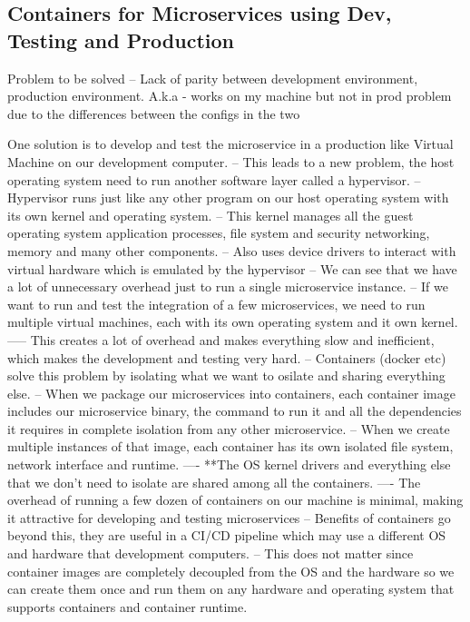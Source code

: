 \documentclass[a4paper, 11pt]{book}
\begin{document}
{    \subsection{Containers for Microservices using Dev, Testing and Production}
    Problem to be solved -- Lack of parity between development environment, production environment.
    A.k.a - works on my machine but not in prod problem due to the differences between the configs in the two

    One solution is to develop and test the microservice in a production like Virtual Machine on our development computer.
    -- This leads to a new problem, the host operating system need to run another software layer called a hypervisor.
    -- Hypervisor runs just like any other program on our host operating system with its own kernel and operating system.
    -- This kernel manages all the guest operating system application processes, file system and security networking, memory and many other components.
    -- Also uses device drivers to interact with virtual hardware which is emulated by the hypervisor
    -- We can see that we have a lot of unnecessary overhead just to run a single microservice instance.
    -- If we want to run and test the integration of a few microservices, we need to run multiple virtual machines, each with its own operating system and it own kernel.
    ----- This creates a lot of overhead and makes everything slow and inefficient, which makes the development and testing very hard.
    -- Containers (docker etc) solve this problem by isolating what we want to osilate and sharing everything else.
    -- When we package our microservices into containers, each container image includes our microservice binary, the command to run it and all the dependencies it requires in complete isolation from any other microservice.
    -- When we create multiple instances of that image, each container has its own isolated file system, network interface and runtime.
    ---- **The OS kernel drivers and everything else that we don't need to isolate are shared among all the containers.
    ---- The overhead of running a few dozen of containers on our machine is minimal, making it attractive for developing and testing microservices
    -- Benefits of containers go beyond this, they are useful in a CI/CD pipeline which may use a different OS and hardware that development computers.
    -- This does not matter since container images are completely decoupled from the OS and the hardware so we can create them once and run them on any hardware and operating system that supports containers and container runtime.

}
\end{document}
